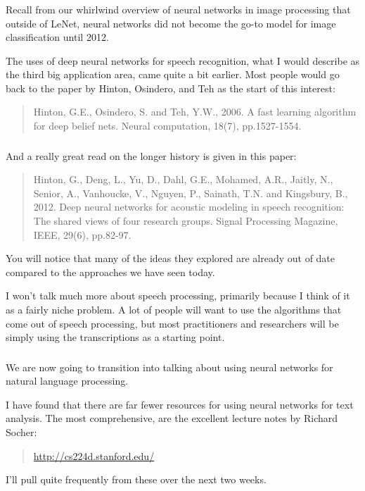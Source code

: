 \documentclass[xetex,mathserif,serif,aspectratio=169]{beamer}
\begin{document}
\begin{frame}[fragile] \frametitle{} \oldB \small


Recall from our whirlwind overview of neural networks in image
processing that outside of LeNet, neural networks did not become
the go-to model for image classification until 2012.

The uses of deep neural networks for speech recognition, what I would
describe as the third big application area, came quite a bit earlier.
Most people would go back to the paper by Hinton, Osindero, and Teh
as the start of this interest:
\begin{quote}
Hinton, G.E., Osindero, S. and Teh, Y.W., 2006. A fast learning
algorithm for deep belief nets. Neural computation, 18(7), pp.1527-1554.
\end{quote}

\end{frame}

\begin{frame}[fragile] \frametitle{} \oldB \small


And a really great read on the longer history is given in this paper:
\begin{quote}
Hinton, G., Deng, L., Yu, D., Dahl, G.E., Mohamed, A.R., Jaitly, N.,
Senior, A., Vanhoucke, V., Nguyen, P., Sainath, T.N. and Kingsbury, B.,
2012. Deep neural networks for acoustic modeling in speech recognition:
The shared views of four research groups. Signal Processing Magazine,
IEEE, 29(6), pp.82-97.
\end{quote}
You will notice that many of the ideas they explored are already out of
date compared to the approaches we have seen today.

\pause I won't talk much more about speech processing, primarily because
I think of it as a fairly niche problem. A lot of people will want to use
the algorithms that come out of speech processing, but most practitioners
and researchers will be simply using the transcriptions as a starting
point.

\end{frame}

\begin{frame}[fragile] \frametitle{} \oldB \small


We are now going to transition into talking about using neural networks
for natural language processing.

I have found that there are far fewer resources for using neural networks
for text analysis. The most comprehensive, are the excellent lecture notes
by Richard Socher:
\begin{quote}
\url{http://cs224d.stanford.edu/}
\end{quote}
I'll pull quite frequently from these over the next two weeks.

\end{frame}
\end{document}
